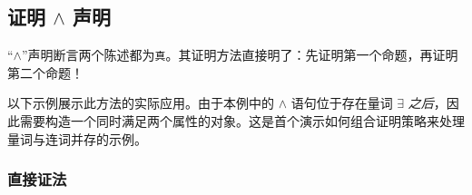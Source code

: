 \subsection{证明 $\land$ 声明}\label{sec:section4.9.4}

``$\land$''声明断言两个陈述都为\verb|真|。其证明方法直接明了：先证明第一个命题，再证明第二个命题！

以下示例展示此方法的实际应用。由于本例中的 $\land$ 语句位于存在量词 $\exists$ \emph{之后}，因此需要构造一个同时满足两个属性的对象。这是首个演示如何组合证明策略来处理量词与连词并存的示例。

\subsubsection*{直接证法}

\begin{center}
    \noindent {}
\end{center}

